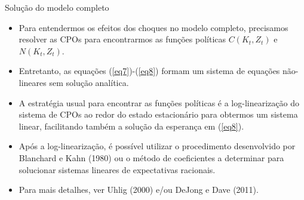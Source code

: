 \documentclass[10pt]{beamer}
\begin{document}
\begin{frame}{Solução do modelo completo}
    \begin{itemize}
        \item Para entendermos os efeitos dos choques no modelo completo, precisamos resolver as CPOs para encontrarmos as funções políticas $C(K_t, Z_t)$ e $N(K_t, Z_t)$.
        \bigskip
        \item Entretanto, as equações (\ref{eq7})-(\ref{eq8}) formam um sistema de equações não-lineares sem solução analítica.
        \bigskip
        \item A estratégia usual para encontrar as funções políticas é a log-linearização do sistema de CPOs ao redor do estado estacionário para obtermos um sistema linear, facilitando também a solução da esperança em (\ref{eq8}).
        \bigskip
        \item Após a log-linearização, é possível utilizar o procedimento desenvolvido por Blanchard e Kahn (1980) ou o método de coeficientes a determinar para solucionar sistemas lineares de expectativas racionais.
        \bigskip
        \item Para mais detalhes, ver Uhlig (2000) e/ou DeJong e Dave (2011).
    \end{itemize}
\end{frame}
\end{document}

